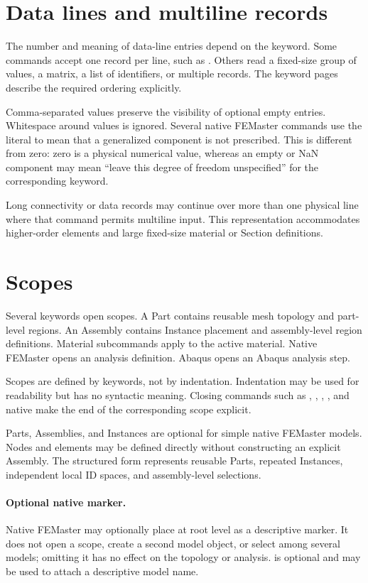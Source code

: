 \section{Data lines and multiline records}

The number and meaning of data-line entries depend on the keyword. Some commands accept one record per line, such as . Others read a fixed-size group of values, a matrix, a list of identifiers, or multiple records. The keyword pages describe the required ordering explicitly.

Comma-separated values preserve the visibility of optional empty entries. Whitespace around values is ignored. Several native FEMaster commands use the literal  to mean that a generalized component is not prescribed. This is different from zero: zero is a physical numerical value, whereas an empty or NaN component may mean ``leave this degree of freedom unspecified'' for the corresponding keyword.

Long connectivity or data records may continue over more than one physical line where that command permits multiline input. This representation accommodates higher-order elements and large fixed-size material or Section definitions.

\section{Scopes}

Several keywords open scopes. A Part contains reusable mesh topology and part-level regions. An Assembly contains Instance placement and assembly-level region definitions. Material subcommands apply to the active material. Native FEMaster  opens an analysis definition. Abaqus  opens an Abaqus analysis step.

Scopes are defined by keywords, not by indentation. Indentation may be used for readability but has no syntactic meaning. Closing commands such as , , , , and native  make the end of the corresponding scope explicit.

Parts, Assemblies, and Instances are optional for simple native FEMaster models. Nodes and elements may be defined directly without constructing an explicit Assembly. The structured form represents reusable Parts, repeated Instances, independent local ID spaces, and assembly-level selections.

\paragraph{Optional native  marker.}
Native FEMaster may optionally place  at root level as a descriptive marker. It does not open a scope, create a second model object, or select among several models; omitting it has no effect on the topology or analysis.  is optional and may be used to attach a descriptive model name.

